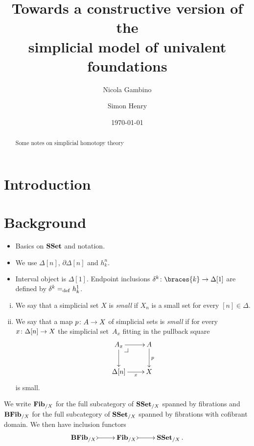 \documentclass[reqno,10pt,a4paper,oneside,draft]{amsart}
\title[]{Towards a constructive version of the \\ simplicial model of univalent foundations}
\begin{document}
\begin{abstract}
Some notes on simplicial homotopy theory
\end{abstract}

\author{Nicola Gambino}

\author{Simon Henry}


 \date{\today}

\maketitle

\section{Introduction}

\newpage


\section{Background}


\begin{itemize}
\item Basics on $\mathbf{SSet}$ and notation. 
\item We use $\Delta[n]$, $\partial \Delta[n]$ and $h^n_k$.
\item Interval object is $\Delta[1]$. Endpoint inclusions $\kcyl \co \braces{ k} \to \Delta[1]$ are
defined by $\delta^k =_{\operatorname{def}} h^1_k$.
\end{itemize}


\begin{definition} \hfill 
\label{thm:small}
\begin{enumerate}[(i)]
\item We say that a simplicial set $X$ is \emph{small}  if $X_n$ is a small set for every $[n] \in \Delta$. 
\item We say that a map $p \colon A \to X$ of simplicial sets is \emph{small} if for every $x \colon \Delta[n] 
\to X$ the simplicial set~$A_x$ fitting in the pullback square
\[
\xymatrix{
A_x \ar[r] \ar[d] \drpullback & A \ar[d]^{p} \\
\Delta[n] \ar[r]_-{x} & X }
\]
is small.
\end{enumerate}
\end{definition} 

\bigskip

We write $\mathbf{Fib}_{/X}$ for the full subcategory of $\mathbf{SSet}_{/X}$ spanned by fibrations and $\mathbf{BFib}_{/X}$ for the full subcategory of  $\mathbf{SSet}_{/X}$ spanned by fibrations with cofibrant domain. We then have inclusion
functors
\[
\xymatrix{
\BFFib_{/X} \ar@{>->}[r] &
\FFib_{/X} \ar@{>->}[r] &
\SSet_{/X} \, .}
\]
\end{document}
